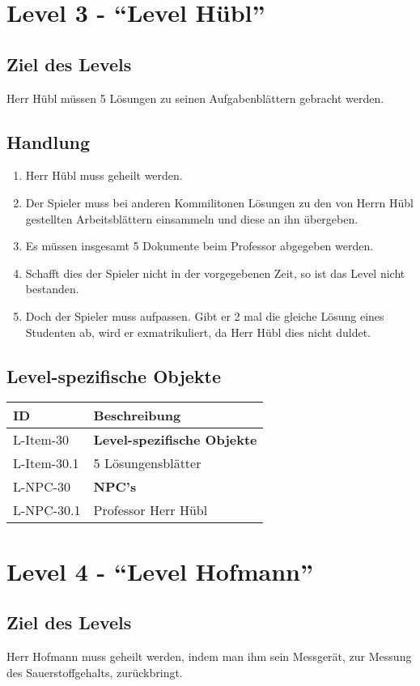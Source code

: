 \section{Level 3 - \enquote{Level Hübl}}
\subsection{Ziel des Levels}
Herr Hübl müssen 5 Lösungen zu seinen Aufgabenblättern gebracht werden.
\subsection{Handlung}
\begin{enumerate}
\item Herr Hübl muss geheilt werden.
\item Der Spieler muss bei anderen Kommilitonen Lösungen zu den von Herrn Hübl gestellten Arbeitsblättern einsammeln und diese an ihn übergeben.
\item Es müssen insgesamt 5 Dokumente beim Professor abgegeben werden. 
\item Schafft dies der Spieler nicht in der vorgegebenen Zeit, so ist das Level nicht bestanden.
\item  Doch der Spieler muss aufpassen. Gibt er 2 mal die gleiche Lösung eines Studenten ab, wird er exmatrikuliert, da Herr Hübl dies nicht duldet.
\end{enumerate}
\subsection{Level-spezifische Objekte}
\begin{tabularx}{\textwidth}{|l|l|}
\toprule
\textbf{ID} & \textbf{Beschreibung}\\
\endhead
\hline
L-Item-30 & \textbf{Level-spezifische Objekte} \\
L-Item-30.1 & 5 Lösungensblätter  \\
\hline
L-NPC-30 & \textbf{NPC's} \\
L-NPC-30.1 & Professor Herr Hübl \\
\hline
\end{tabularx}



\section{Level 4 - \enquote{Level Hofmann}}
\subsection{Ziel des Levels}
Herr Hofmann muss geheilt werden, indem man ihm sein Messgerät, zur Messung des Sauerstoffgehalts, zurückbringt.

